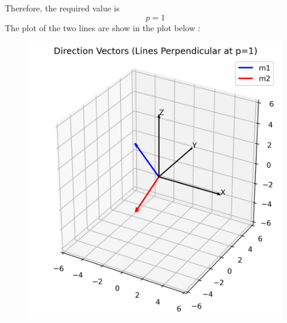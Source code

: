 \documentclass[journal]{IEEEtran}
\begin{document}
Therefore, the required value is
$$
	\boxed{p=1}
$$
The plot of the two lines are show in the plot below :
\begin{figure}[H]
	\centering
	\includegraphics[width=0.8\linewidth]{figs/equations_solution}
	\caption{}
	\label{fig:equationssolution}
\end{figure}

	
\end{document}
